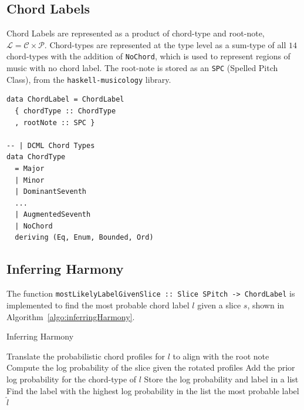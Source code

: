 \documentclass[12pt,a4paper,twoside,openany]{report} \usepackage[pdfborder={0 0 0}]{hyperref}    %
\theoremstyle{definition} \newtheorem{definition}{Definition}[section]
\begin{document}
    \subsection{Chord Labels}

    Chord Labels are represented as a product of chord-type and root-note, $\mathcal{L} = \mathcal{C} \times
    \mathcal{P}$. Chord-types are represented at the type level as a sum-type of all $14$ chord-types with the
    addition of \texttt{NoChord}, which is used to represent regions of music with no chord label. 
    The root-note is stored as an \texttt{SPC} (Spelled Pitch Class), from the
    \texttt{haskell-musicology} library.
    
    \begin{lstlisting}[caption={Chord Label Implementation}, captionpos=b] 
data ChordLabel = ChordLabel
  { chordType :: ChordType
  , rootNote :: SPC }

-- | DCML Chord Types
data ChordType
  = Major
  | Minor
  | DominantSeventh
  ...
  | AugmentedSeventh
  | NoChord
  deriving (Eq, Enum, Bounded, Ord)
    \end{lstlisting}

    \subsection{Inferring Harmony}

    The function \texttt{mostLikelyLabelGivenSlice :: Slice SPitch -> ChordLabel} is implemented to find the most probable
    chord label $l$ given a slice $s$, shown in Algorithm~\ref{algo:inferringHarmony}. 

    \begin{algorithm}[H]
    \caption{Inferring Harmony}
    \label{algo:inferringHarmony}
    \begin{algorithmic}[1]
    \State Translate the probabilistic chord profiles for $l$ to align with the root note
    \State Compute the log probability of the slice given the rotated profiles
    \State Add the prior log probability for the chord-type of $l$
    \State Store the log probability and label in a list
    \EndFor
    \State Find the label with the highest log probability in the list
    \State \Return the most probable label $\hat{l}$
    \end{algorithmic}
    \end{algorithm}
\end{document}
